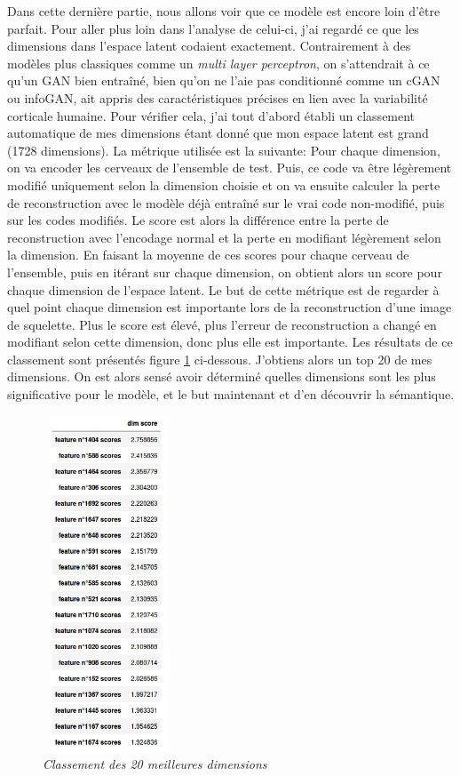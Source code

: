 \documentclass[12pt, oneside, a4paper, titlepage]{article}
\begin{document}
Dans cette dernière partie, nous allons voir que ce modèle est encore loin d'être parfait.
Pour aller plus loin dans l'analyse de celui-ci, j'ai regardé ce que les dimensions dans l'espace latent codaient exactement. Contrairement à des modèles plus classiques comme un \textit{multi layer perceptron}, on s'attendrait à ce qu'un GAN bien entraîné, bien qu'on ne l'aie pas conditionné comme un cGAN ou infoGAN, ait appris des caractéristiques précises en lien avec la variabilité corticale humaine. Pour vérifier cela, j'ai tout d'abord établi un classement automatique de mes dimensions étant donné que mon espace latent est grand (1728 dimensions). La métrique utilisée est la suivante: Pour chaque dimension, on va encoder les cerveaux de l'ensemble de test. Puis, ce code va être légèrement modifié uniquement selon la dimension choisie et on va ensuite calculer la perte de reconstruction avec le modèle déjà entraîné sur le vrai code non-modifié, puis sur les codes modifiés. Le score est alors la différence entre la perte de reconstruction avec l'encodage normal et la perte en modifiant légèrement selon la dimension. En faisant la moyenne de ces scores pour chaque cerveau de l'ensemble, puis en itérant sur chaque dimension, on obtient alors un score pour chaque dimension de l'espace latent. Le but de cette métrique est de regarder à quel point chaque dimension est importante lors de la reconstruction d'une image de squelette. Plus le score est élevé, plus l'erreur de reconstruction a changé en modifiant selon cette dimension, donc plus elle est importante. Les résultats de ce classement sont présentés figure \ref{fig:range} ci-dessous. J'obtiens alors un top 20 de mes dimensions. On est alors sensé avoir déterminé quelles dimensions sont les plus significative pour le modèle, et le but maintenant et d'en découvrir la sémantique.

\begin{figure}[H]
\centering
\includegraphics[width=4cm, height=10cm]{feature_score.png}
    \caption{\textit{Classement des 20 meilleures dimensions}}
    \label{fig:range}
\end{figure}
\end{document}

